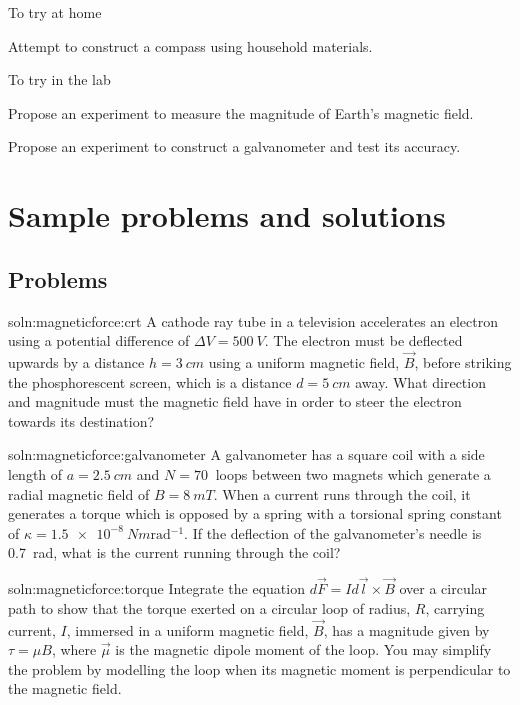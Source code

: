 \begin{chapteractivity}{To try at home}
{
\item Attempt to construct a compass using household materials.
}
\end{chapteractivity}

\begin{chapteractivity}{To try in the lab}
{
\item Propose an experiment to measure the magnitude of Earth's magnetic field.
\item Propose an experiment to construct a galvanometer and test its accuracy.
}
\end{chapteractivity}

\newpage
\section{Sample problems and solutions}

\subsection{Problems}
\begin{problem}{soln:magneticforce:crt}
{\label{prob:magneticforce:crt} 
A cathode ray tube in a television accelerates an electron using a potential difference of $\Delta V=\SI{500}{V}$. The electron must be deflected upwards by a distance $h=\SI{3}{cm}$ using a uniform magnetic field, $\vec B$, before striking the phosphorescent screen, which is a distance $d= \SI{5}{cm}$ away. What direction and magnitude must the magnetic field have in order to steer the electron towards its destination?
}
\end{problem}

\begin{problem}{soln:magneticforce:galvanometer}
{\label{prob:magneticforce:galvanometer} 
A galvanometer has a square coil with a side length of $a=\SI{2.5}{cm}$ and $N=\SI{70}{}$ loops between two magnets which generate a radial magnetic field of $B=\SI{8}{mT}$. When a current runs through the coil, it generates a torque which is opposed by a spring with a torsional spring constant of $\kappa = \SI{1.5e-8}{Nm\radian^{-1}}$. If the deflection of the galvanometer's needle is \SI{0.7}{\radian}, what is the current running through the coil?
}
\end{problem}

\begin{problem}{soln:magneticforce:torque}
{\label{prob:magneticforce:torque} 
Integrate the equation $d\vec F = Id\vec l \times \vec B$ over a circular path to show that the torque exerted on a circular loop of radius, $R$, carrying current, $I$, immersed in a uniform magnetic field, $\vec B$, has a magnitude given by $\tau=\mu B$, where $\vec \mu$ is the magnetic dipole moment of the loop. You may simplify the problem by modelling the loop when its magnetic moment is perpendicular to the magnetic field.
}
\end{problem}

